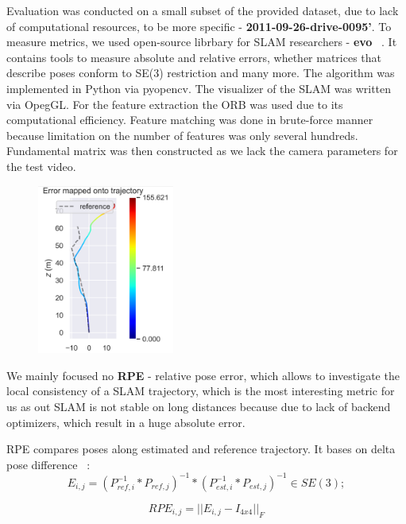 Evaluation was conducted on a small subset of the provided dataset, due to lack of computational resources, to be more specific - {\bf 2011-09-26-drive-0095'}. 
To measure metrics, we used open-source librbary for SLAM researchers - {\bf evo} ~\cite{Evo}. It contains tools to measure absolute and relative errors, whether matrices that describe poses conform to SE(3) restriction and many more. 
\vskip 1cm
The algorithm was implemented in Python via pyopencv. The visualizer of the SLAM was written via OpegGL. For the feature extraction the ORB was used due to its computational efficiency. Feature matching was done in brute-force manner because limitation on the number of features was only several hundreds. Fundamental matrix was then constructed as we lack the camera parameters for the test video. 

\begin{figure}
    \centering
    \includegraphics[width=0.4\textwidth]{results/error_mapped.png}
\end{figure}

We mainly focused no {\bf RPE} - relative pose error, which allows to investigate the local consistency of a SLAM trajectory, which is the most interesting metric for us as out SLAM is not stable on long distances because due to lack of backend optimizers, which result in a huge absolute error.

RPE compares poses along estimated and reference trajectory. It bases on delta pose difference ~\cite{ErrorMeasurement}: 
\begin{equation}
E_{i, j} = (P^{-1}_{ref, i} * P_{ref, j})^{-1} * (P^{-1}_{est, i} * P_{est, j})^{-1} \in SE(3);
\end{equation}

\begin{equation}
    RPE_{i, j} = ||E_{i, j} - I_{4 x 4}||_{F}
\end{equation}

